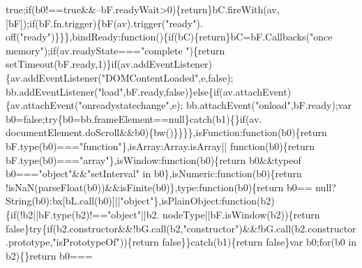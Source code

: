 \begin{DoxyCode}
{      true};\textcolor{keywordflow}{if}(b0!==\textcolor{keyword}{true}&&--bF.readyWait>0)\{\textcolor{keywordflow}{return}\}bC.fireWith(av,[bF]);\textcolor{keywordflow}{if}(bF.fn.trigger)\{bF(av).trigger(\textcolor{stringliteral}{"ready"}).
      off(\textcolor{stringliteral}{"ready"})\}\}\},bindReady:\textcolor{keyword}{function}()\{\textcolor{keywordflow}{if}(bC)\{\textcolor{keywordflow}{return}\}bC=bF.Callbacks(\textcolor{stringliteral}{"once memory"});\textcolor{keywordflow}{if}(av.readyState===\textcolor{stringliteral}{"complete
      "})\{\textcolor{keywordflow}{return} setTimeout(bF.ready,1)\}\textcolor{keywordflow}{if}(av.addEventListener)\{av.addEventListener(\textcolor{stringliteral}{"DOMContentLoaded"},e,\textcolor{keyword}{false});
      bb.addEventListener(\textcolor{stringliteral}{"load"},bF.ready,\textcolor{keyword}{false})\}\textcolor{keywordflow}{else}\{\textcolor{keywordflow}{if}(av.attachEvent)\{av.attachEvent(\textcolor{stringliteral}{"onreadystatechange"},e);
      bb.attachEvent(\textcolor{stringliteral}{"onload"},bF.ready);var b0=\textcolor{keyword}{false};\textcolor{keywordflow}{try}\{b0=bb.frameElement==null\}\textcolor{keywordflow}{catch}(b1)\{\}\textcolor{keywordflow}{if}(av.
      documentElement.doScroll&&b0)\{bw()\}\}\}\},isFunction:\textcolor{keyword}{function}(b0)\{\textcolor{keywordflow}{return} bF.type(b0)===\textcolor{stringliteral}{"function"}\},isArray:Array.isArray||\textcolor{keyword}{
      function}(b0)\{\textcolor{keywordflow}{return} bF.type(b0)===\textcolor{stringliteral}{"array"}\},isWindow:\textcolor{keyword}{function}(b0)\{\textcolor{keywordflow}{return} b0&&typeof b0===\textcolor{stringliteral}{"object"}&&\textcolor{stringliteral}{"setInterval"}
       in b0\},isNumeric:\textcolor{keyword}{function}(b0)\{\textcolor{keywordflow}{return} !isNaN(parseFloat(b0))&&isFinite(b0)\},type:\textcolor{keyword}{function}(b0)\{\textcolor{keywordflow}{return} b0==
      null?String(b0):bx[bL.call(b0)]||\textcolor{stringliteral}{"object"}\},isPlainObject:function(b2)\{\textcolor{keywordflow}{if}(!b2||bF.type(b2)!==\textcolor{stringliteral}{"object"}||b2.
      nodeType||bF.isWindow(b2))\{\textcolor{keywordflow}{return} \textcolor{keyword}{false}\}\textcolor{keywordflow}{try}\{\textcolor{keywordflow}{if}(b2.constructor&&!bG.call(b2,\textcolor{stringliteral}{"constructor"})&&!bG.call(b2.constructor
      .prototype,\textcolor{stringliteral}{"isPrototypeOf"}))\{\textcolor{keywordflow}{return} \textcolor{keyword}{false}\}\}\textcolor{keywordflow}{catch}(b1)\{\textcolor{keywordflow}{return} \textcolor{keyword}{false}\}var b0;\textcolor{keywordflow}{for}(b0 in b2)\{\}\textcolor{keywordflow}{return} b0===

\end{DoxyCode}
